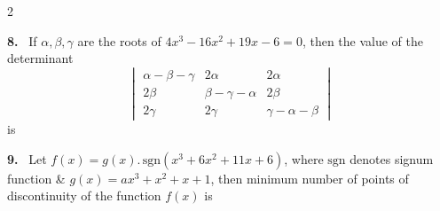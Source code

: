 \documentclass[10pt]{extarticle}
\newcommand{\qn}[1]{\par\smallskip\noindent\textbf{#1.}~}
\begin{document}
\begin{multicols}{2}
\qn{8} If $\alpha,\beta,\gamma$ are the roots of $4x^3-16x^2+19x-6=0$, then the value of the determinant
\[ \begin{vmatrix}\alpha-\beta-\gamma&2\alpha&2\alpha\\2\beta&\beta-\gamma-\alpha&2\beta\\2\gamma&2\gamma&\gamma-\alpha-\beta\end{vmatrix} \]
is
\qn{9} Let $f(x)=g(x).\,\mathrm{sgn}(x^3+6x^2+11x+6)$, where $\mathrm{sgn}$ denotes signum function \& $g(x)=ax^3+x^2+x+1$, then minimum number of points of discontinuity of the function $f(x)$ is
\end{multicols}
\end{document}

